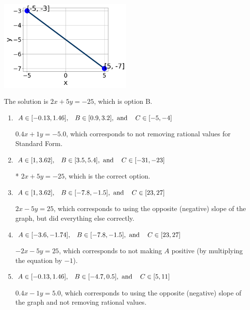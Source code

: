 \documentclass{extbook}[14pt]
\begin{document}
\begin{enumerate}
{\begin{center}
    \includegraphics[width=0.5\textwidth]{../Figures/linearGraphToStandardCopyB.png}
\end{center}




The solution is \( 2x + 5y = -25 \), which is option B.\begin{enumerate}[label=\Alph*.]
\item \( A \in [-0.13, 1.46], \hspace{3mm} B \in [0.9, 3.2], \text{ and } \hspace{3mm} C \in [-5, -4] \)

 $0.4x + 1y = -5.0$, which corresponds to not removing rational values for Standard Form.
\item \( A \in [1, 3.62], \hspace{3mm} B \in [3.5, 5.4], \text{ and } \hspace{3mm} C \in [-31, -23] \)

* $2x + 5y = -25$, which is the correct option.
\item \( A \in [1, 3.62], \hspace{3mm} B \in [-7.8, -1.5], \text{ and } \hspace{3mm} C \in [23, 27] \)

 $2x - 5y = 25$, which corresponds to using the opposite (negative) slope of the graph, but did everything else correctly.
\item \( A \in [-3.6, -1.74], \hspace{3mm} B \in [-7.8, -1.5], \text{ and } \hspace{3mm} C \in [23, 27] \)

 $-2x - 5y = 25$, which corresponds to not making $A$ positive (by multiplying the equation by $-1$).
\item \( A \in [-0.13, 1.46], \hspace{3mm} B \in [-4.7, 0.5], \text{ and } \hspace{3mm} C \in [5, 11] \)

 $0.4x - 1y = 5.0$, which corresponds to using the opposite (negative) slope of the graph and not removing rational values.
\end{enumerate}

}
\end{enumerate}
\end{document}
